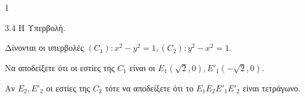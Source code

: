 \begin{ylh}{1}
    \item 3.4 Η Υπερβολή.
\end{ylh}
Δίνονται οι υπερβολές $(C_1):x^2-y^2=1,(C_2):y^2-x^2=1.$
\begin{alist}
\item Να αποδείξετε ότι οι εστίες της $C_1$ είναι οι $E_1(\sqrt{2},0), E'_1(-\sqrt{2},0).$ 
\item Αν $E_2,E'_2$ οι εστίες της $C_2$ τότε να αποδείξετε ότι το $E_1E_2E'_1E'_2$ είναι τετράγωνο. 
\end{alist}